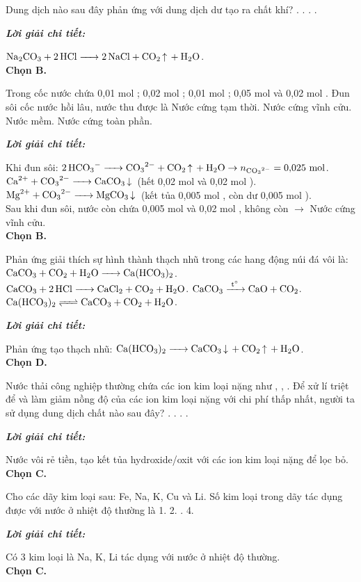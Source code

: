 \documentclass[11pt,a4paper]{article}
\def\loigiai#1{
\par\begingroup\color{blue!80!black}\small
\noindent\textbf{\textit{Lời giải chi tiết:}}\par
#1\par\endgroup}
\begin{document}
\begin{ex}
Dung dịch nào sau đây phản ứng với dung dịch  dư tạo ra chất khí?
\choice
{.}
{\True {}.}
{.}
{.}
\loigiai{
$\ce{Na2CO3 + 2HCl -> 2NaCl + CO2 ^ + H2O}$.\\
\textbf{Chọn B.}}
\end{ex}

\begin{ex}
Trong cốc nước chứa 0,01 mol ; 0,02 mol ; 0,01 mol ; 0,05 mol  và 0,02 mol . Đun sôi cốc nước hồi lâu, nước thu được là
\choice
{Nước cứng tạm thời.}
{\True Nước cứng vĩnh cửu.}
{Nước mềm.}
{Nước cứng toàn phần.}
\loigiai{
Khi đun sôi: $\ce{2HCO3- -> CO3^2- + CO2 ^ + H2O} \rightarrow n_{\ce{CO3^2-}} = 0{,}025\text{ mol}$.\\
$\ce{Ca^2+ + CO3^2- -> CaCO3 v}$ (hết 0,02 mol \ce{Ca^2+} và 0,02 mol \ce{CO3^2-}).\\
$\ce{Mg^2+ + CO3^2- -> MgCO3 v}$ (kết tủa 0,005 mol \ce{Mg^2+}, còn dư 0,005 mol \ce{Mg^2+}).\\
Sau khi đun sôi, nước còn chứa 0,005 mol \ce{Mg^2+} và 0,02 mol \ce{Cl-}, không còn \ce{HCO3-} $\rightarrow$ Nước cứng vĩnh cửu.\\
\textbf{Chọn B.}}
\end{ex}

\begin{ex}
Phản ứng giải thích sự hình thành thạch nhũ trong các hang động núi đá vôi là:
\choice
{$\ce{CaCO3 + CO2 + H2O -> Ca(HCO3)2}$.}
{$\ce{CaCO3 + 2HCl -> CaCl2 + CO2 + H2O}$.}
{$\ce{CaCO3 ->[t^\circ] CaO + CO2}$.}
{\True $\ce{Ca(HCO3)2 <=> CaCO3 + CO2 + H2O}$.}
\loigiai{
Phản ứng tạo thạch nhũ: $\ce{Ca(HCO3)2 -> CaCO3 v + CO2 ^ + H2O}$.\\
\textbf{Chọn D.}}
\end{ex}

\begin{ex}
Nước thải công nghiệp thường chứa các ion kim loại nặng như , , . Để xử lí triệt để và làm giảm nồng độ của các ion kim loại nặng với chi phí thấp nhất, người ta sử dụng dung dịch chất nào sau đây?
\choice
{.}
{.}
{\True {}.}
{.}
\loigiai{
Nước vôi \ce{Ca(OH)2} rẻ tiền, tạo kết tủa hydroxide/oxit với các ion kim loại nặng để lọc bỏ.\\
\textbf{Chọn C.}}
\end{ex}

\begin{ex}
Cho các dãy kim loại sau: Fe, Na, K, Cu và Li. Số kim loại trong dãy tác dụng được với nước ở nhiệt độ thường là
\choice
{1.}
{2.}
{.}
{4.}
\loigiai{
Có 3 kim loại là Na, K, Li tác dụng với nước ở nhiệt độ thường.\\
\textbf{Chọn C.}}
\end{ex}
\end{document}
